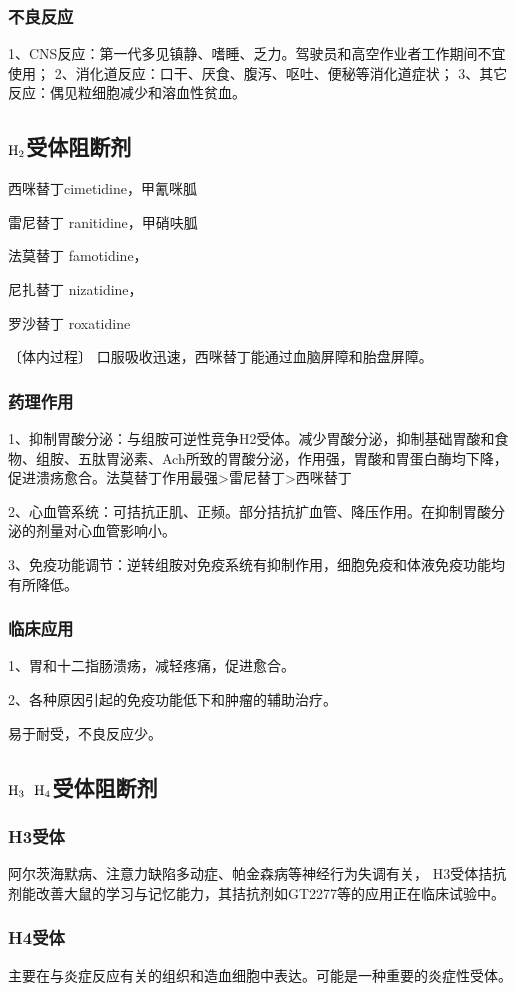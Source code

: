 \documentclass[UTF8]{ctexbook}
\begin{document}
\subsubsection{不良反应}
1、CNS反应：第一代多见镇静、嗜睡、乏力。驾驶员和高空作业者工作期间不宜使用；
2、消化道反应：口干、厌食、腹泻、呕吐、便秘等消化道症状；
3、其它反应：偶见粒细胞减少和溶血性贫血。

\subsection{\(\textup{H}_{2}\)受体阻断剂}
西咪替丁cimetidine，甲氰咪胍

雷尼替丁 ranitidine，甲硝呋胍

法莫替丁 famotidine，

尼扎替丁 nizatidine，

罗沙替丁 roxatidine

〔体内过程〕
口服吸收迅速，西咪替丁能通过血脑屏障和胎盘屏障。

\subsubsection{药理作用}
1、抑制胃酸分泌：与组胺可逆性竞争H2受体。减少胃酸分泌，抑制基础胃酸和食物、组胺、五肽胃泌素、Ach所致的胃酸分泌，作用强，胃酸和胃蛋白酶均下降，促进溃疡愈合。法莫替丁作用最强>雷尼替丁>西咪替丁

2、心血管系统：可拮抗正肌、正频。部分拮抗扩血管、降压作用。在抑制胃酸分泌的剂量对心血管影响小。

3、免疫功能调节：逆转组胺对免疫系统有抑制作用，细胞免疫和体液免疫功能均有所降低。
\subsubsection{临床应用}
1、胃和十二指肠溃疡，减轻疼痛，促进愈合。

2、各种原因引起的免疫功能低下和肿瘤的辅助治疗。

易于耐受，不良反应少。
\subsection{\(\textup{H}_{3}\) \(\textup{H}_{4}\)受体阻断剂}
\subsubsection{H3受体}
阿尔茨海默病、注意力缺陷多动症、帕金森病等神经行为失调有关， H3受体拮抗剂能改善大鼠的学习与记忆能力，其拮抗剂如GT2277等的应用正在临床试验中。
\subsubsection{H4受体}
主要在与炎症反应有关的组织和造血细胞中表达。可能是一种重要的炎症性受体。
\end{document}
